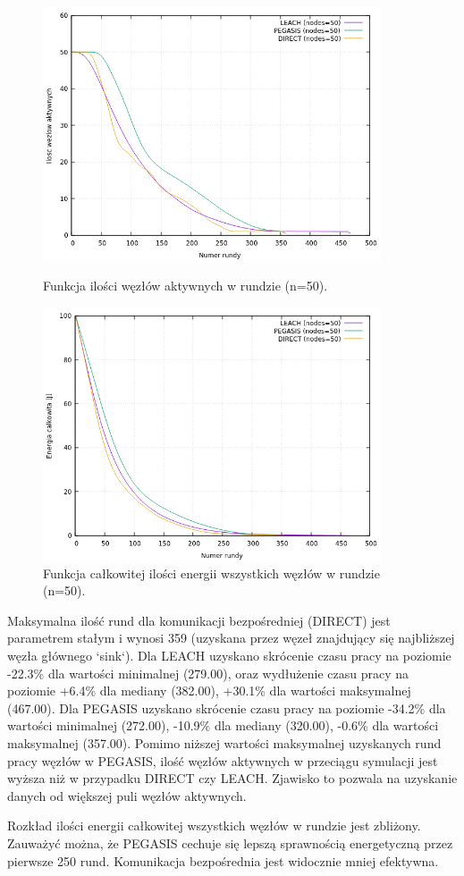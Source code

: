 \documentclass[a4paper,12pt,twoside,openany]{report}
\begin{document}
\begin{figure}[H]
 \centering
 \includegraphics[width=10cm]{images/gnuplot/test_2/nodes_in_round_50.png}
 \caption{Funkcja ilości węzłów aktywnych w rundzie (n=50).}
 \includegraphics[width=10cm]{images/gnuplot/test_2/energy_in_round_50.png}
 \caption{Funkcja całkowitej ilości energii wszystkich węzłów w rundzie (n=50).}
\end{figure}

\par
Maksymalna ilość rund dla komunikacji bezpośredniej (DIRECT) jest parametrem stałym i wynosi 359 (uzyskana przez węzeł znajdujący się najbliższej węzła głównego `sink`).
Dla LEACH uzyskano skrócenie czasu pracy na poziomie -22.3\% dla wartości minimalnej (279.00), oraz wydłużenie czasu pracy na poziomie +6.4\% dla mediany (382.00), +30.1\% dla wartości maksymalnej (467.00).
Dla PEGASIS uzyskano skrócenie czasu pracy na poziomie -34.2\% dla wartości minimalnej (272.00), -10.9\% dla mediany (320.00), -0.6\% dla wartości maksymalnej (357.00).
Pomimo niższej wartości maksymalnej uzyskanych rund pracy węzłów w PEGASIS, ilość węzłów aktywnych w przeciągu symulacji jest wyższa niż w przypadku DIRECT czy LEACH.
Zjawisko to pozwala na uzyskanie danych od większej puli węzłów aktywnych.
\par
Rozkład ilości energii całkowitej wszystkich węzłów w rundzie jest zbliżony.
Zauważyć można, że PEGASIS cechuje się lepszą sprawnością energetyczną przez pierwsze 250 rund.  Komunikacja bezpośrednia jest widocznie mniej efektywna.
\end{document}
